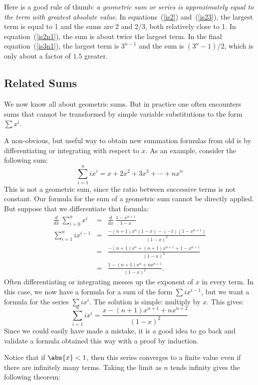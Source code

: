 Here is a good rule of thumb: {\em a geometric sum or series is
approximately equal to the term with greatest absolute value}.  In
equations~(\ref{is2}) and~(\ref{is23}), the largest term is equal to 1 and
the sums are 2 and 2/3, both relatively close to 1.  In
equation~(\ref{is2n1}), the sum is about twice the largest term.  In the
final equation~(\ref{is3n1}), the largest term is $3^{n-1}$ and the sum is
$(3^n-1)/2$, which is only about a factor of $1.5$ greater.
\iffalse

\subsection{Related Sums}

We now know all about geometric sums.  But in practice one often
encounters sums that cannot be transformed by simple variable
substitutions to the form $\sum x^i$.

A non-obvious, but useful way to obtain new summation formulas from
old is by differentiating or integrating with respect to $x$.  As an
example, consider the following sum:
\[
\sum_{i=1}^n i x^i = x + 2 x^2 + 3 x^3 + \cdots + n x^n
\]
This is not a geometric sum, since the ratio between successive
terms is not constant.  Our formula for the sum of a geometric sum
cannot be directly applied.  But suppose that we differentiate that
formula:
\begin{eqnarray*}
\frac{d}{dx} \ \sum_{i=0}^{n} x^i
  & = & \frac{d}{dx} \ \frac{1 - x^{n+1}}{1 - x} \\
\sum_{i=1}^{n} i x^{i-1}
 & = & \frac{-(n+1)x^n (1-x) - (-1)(1-x^{n+1})}{(1 - x)^2} \\
 & = & \frac{-(n+1)x^n + (n+1)x^{n+1} + 1 - x^{n+1}}{(1 - x)^2} \\
 & = & \frac{1 - (n+1)x^n + n x^{n+1}}{(1 - x)^2}.
\end{eqnarray*}
Often differentiating or integrating messes up the exponent of $x$ in
every term.  In this case, we now have a formula for a sum of the
form $\sum i x^{i-1}$, but we want a formula for the series $\sum i
x^i$.  The solution is simple: multiply by $x$.  This gives:
\[
\sum_{i=1}^{n} i x^i = \frac{x - (n+1)x^{n+1} + n x^{n+2}}{(1 - x)^2}
\]
Since we could easily have made a mistake, it is a good idea to go
back and validate a formula obtained this way with a proof by
induction.

Notice that if $\abs{x} < 1$, then this series converges to a finite value
even if there are infinitely many terms.  Taking the limit as $n$ tends
infinity gives the following theorem:

